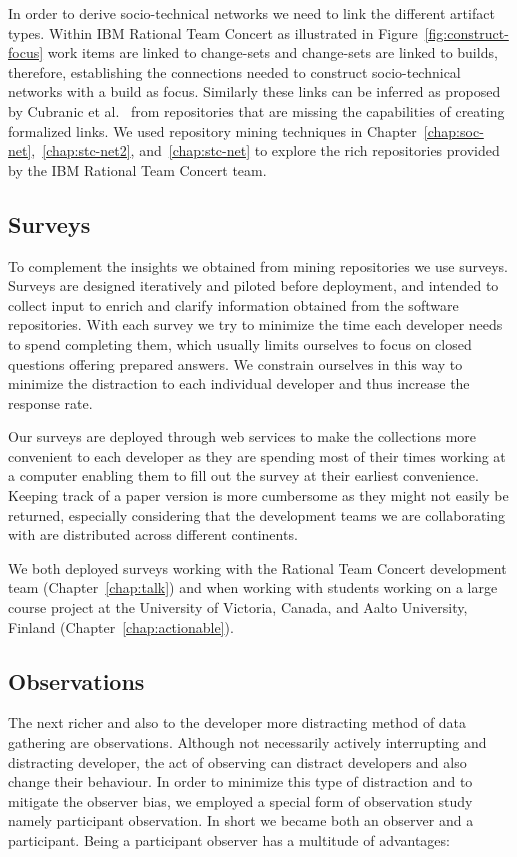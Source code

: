 In order to derive socio-technical networks we need to link the different artifact types.
Within IBM Rational Team Concert as illustrated in Figure~\ref{fig:construct-focus} work items are linked to change-sets and change-sets are linked to builds, therefore, establishing the connections needed to construct socio-technical networks with a build as focus.
Similarly these links can be inferred as proposed by Cubranic et al.~\cite{cubranic:tse:2005} from repositories that are missing the capabilities of creating formalized links.
We used repository mining techniques in Chapter~\ref{chap:soc-net},~\ref{chap:stc-net2}, and~\ref{chap:stc-net} to explore the rich repositories provided by the IBM Rational Team Concert team.

\subsection{Surveys}
To complement the insights we obtained from mining repositories we use surveys.
Surveys are designed iteratively and piloted before deployment, and intended to collect input to enrich and clarify information obtained from the software repositories. 
With each survey we try to minimize the time each developer needs to spend completing them, which usually limits ourselves to focus on closed questions offering prepared answers.
We constrain ourselves in this way to minimize the distraction to each individual developer and thus increase the response rate.

Our surveys are deployed through web services to make the collections more convenient to each developer as they are spending most of their times working at a computer enabling them to fill out the survey at their earliest convenience.
Keeping track of a paper version is more cumbersome as they might not easily be returned, especially considering that the development teams we are collaborating with are distributed across different continents.

We both deployed surveys working with the Rational Team Concert development team (Chapter~\ref{chap:talk}) and when working with students working on a large course project at the University of Victoria, Canada, and Aalto University, Finland (Chapter~\ref{chap:actionable}).


\subsection{Observations}
The next richer and also to the developer more distracting method of data gathering are observations.
Although not necessarily actively interrupting and distracting developer, the act of observing can distract developers and also change their behaviour.
In order to minimize this type of distraction and to mitigate the observer bias, we employed a special form of observation study namely participant observation.
In short we became both an observer and a participant.
%
Being a participant observer has a multitude of advantages:

